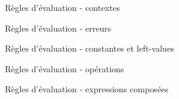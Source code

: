 \begin{figure}

\begin{mathpar}


\end{mathpar}

    \figctx{}

\caption{Règles d'évaluation - contextes}
\end{figure}

\begin{figure}

\begin{mathpar}

\end{mathpar}

\caption{Règles d'évaluation - erreurs}
\end{figure}

\begin{figure}

\begin{mathpar}







\end{mathpar}

\caption{Règles d'évaluation - constantes et left-values}
\end{figure}

\begin{figure}

\begin{mathpar}




\end{mathpar}

\caption{Règles d'évaluation - opérations}
\end{figure}

\begin{figure}

\begin{mathpar}



\end{mathpar}

\caption{Règles d'évaluation - expressions composées}
\end{figure}


